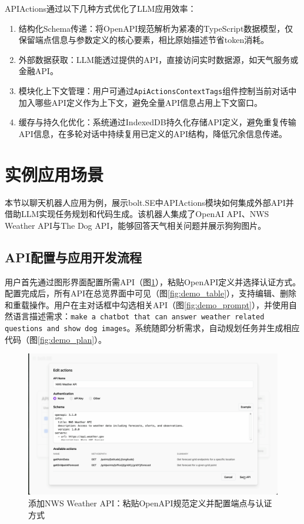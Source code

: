APIActions通过以下几种方式优化了LLM应用效率：

\begin{enumerate}
  \item 结构化Schema传递：将OpenAPI规范解析为紧凑的TypeScript数据模型，仅保留端点信息与参数定义的核心要素，相比原始描述节省token消耗。
  
  \item 外部数据获取：LLM能透过提供的API，直接访问实时数据源，如天气服务或金融API。
  
  \item 模块化上下文管理：用户可通过\texttt{ApiActionsContextTags}组件控制当前对话中加入哪些API定义作为上下文，避免全量API信息占用上下文窗口。
  
  \item 缓存与持久化优化：系统通过IndexedDB持久化存储API定义，避免重复传输API信息，在多轮对话中持续复用已定义的API结构，降低冗余信息传递。
  \end{enumerate}

\section{实例应用场景}

本节以聊天机器人应用为例，展示bolt.SE中APIActions模块如何集成外部API并借助LLM实现任务规划和代码生成。该机器人集成了OpenAI API、NWS Weather API与The Dog API，能够回答天气相关问题并展示狗狗图片。

\subsection{API配置与应用开发流程}

用户首先通过图形界面配置所需API（图\ref{fig:demo_edit}），粘贴OpenAPI定义并选择认证方式。配置完成后，所有API在总览界面中可见（图\ref{fig:demo_table}），支持编辑、删除和重载操作。用户在主对话框中勾选相关API（图\ref{fig:demo_prompt}），并使用自然语言描述需求：\texttt{make a chatbot that can answer weather related questions and show dog images}。系统随即分析需求，自动规划任务并生成相应代码（图\ref{fig:demo_plan}）。

\begin{figure}[htbp]
  \centering
  \includegraphics[width=\textwidth]{figures/screenshots/api-actions/demo_edit_modal.png}
  \caption{添加NWS Weather API：粘贴OpenAPI规范定义并配置端点与认证方式}
  \label{fig:demo_edit}
\end{figure}

